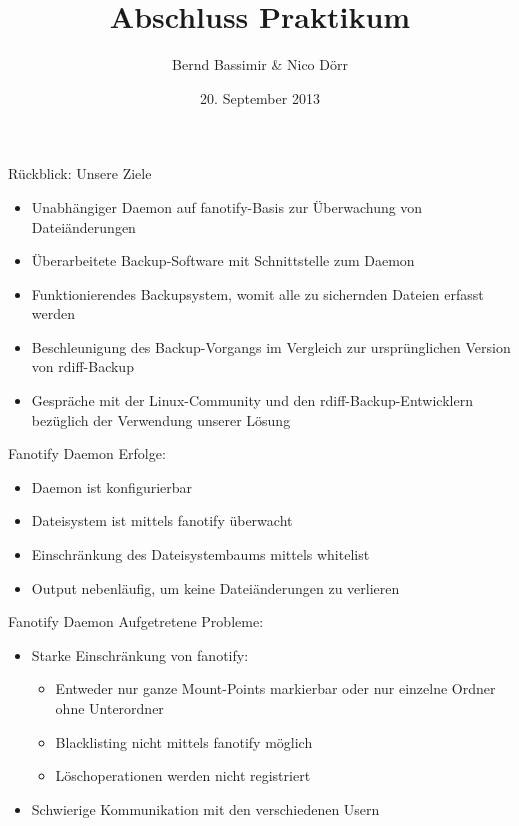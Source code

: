 \documentclass{beamer}
\author{Bernd Bassimir \& Nico D\"orr}
\title{Abschluss Praktikum}
\date[20.9.2013]{20. September 2013}
\begin{document}
\begin{frame}
  \maketitle
\end{frame}
\begin{frame}{R\"uckblick: Unsere Ziele}
  \begin{itemize}
  \item
    Unabh\"angiger Daemon auf fanotify-Basis zur \"Uberwachung von
    Datei\"anderungen \checkmark
  \item
    \"Uberarbeitete Backup-Software mit Schnittstelle zum Daemon
  \item
    Funktionierendes Backupsystem, womit alle zu sichernden Dateien erfasst
    werden \checkmark
  \item
    Beschleunigung des Backup-Vorgangs im Vergleich zur urspr\"unglichen Version
    von rdiff-Backup \checkmark
  \item
    Gespr\"ache mit der Linux-Community und den rdiff-Backup-Entwicklern
    bez\"uglich der Verwendung unserer L\"osung
  \end{itemize}
\end{frame}

\begin{frame}{Fanotify Daemon}
  Erfolge:
  \begin{itemize}
    \item
      Daemon ist konfigurierbar
    \item
      Dateisystem ist mittels fanotify \"uberwacht
    \item
      Einschr\"ankung des Dateisystembaums mittels whitelist
    \item
      Output nebenl\"aufig, um keine Datei\"anderungen zu verlieren
  \end{itemize}
\end{frame}

\begin{frame}{Fanotify Daemon}
  Aufgetretene Probleme:
  \begin{itemize}
    \item
      Starke Einschr\"ankung von fanotify:
      \begin{itemize}
      \item
        Entweder nur ganze Mount-Points markierbar oder nur einzelne Ordner ohne
        Unterordner
      \item
        Blacklisting nicht mittels fanotify m\"oglich
      \item
        L\"oschoperationen werden nicht registriert
      \end{itemize}
    \item
      Schwierige Kommunikation mit den verschiedenen Usern
  \end{itemize}
\end{frame}
\end{document}
